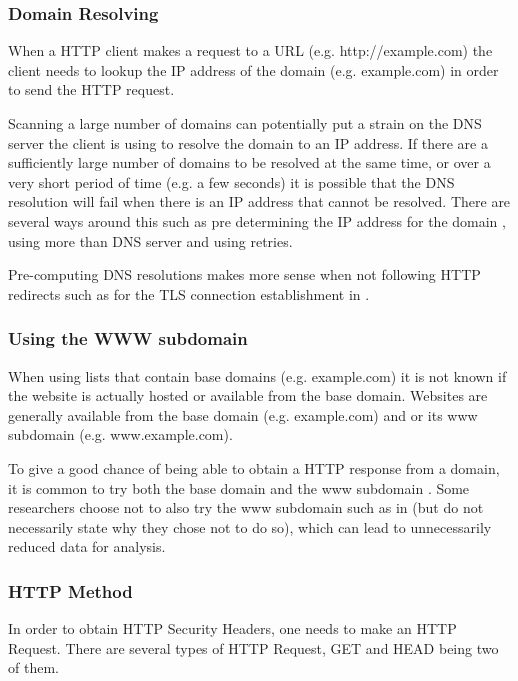 \documentclass{mscreport}
\begin{document}
\subsubsection{Domain Resolving}

When a HTTP client makes a request to a URL (e.g. http://example.com) the client needs to lookup the IP address of the domain (e.g. example.com) in order to send the HTTP request.

\vspace{0.3cm} \noindent
Scanning a large number of domains can potentially put a strain on the DNS server the client is using to resolve the domain to an IP address. If there are a sufficiently large number of domains to be resolved at the same time, or over a very short period of time (e.g. a few seconds) it is possible that the DNS resolution will fail when there is an IP address that cannot be resolved. There are several ways around this such as pre determining the IP address for the domain \cite{Amann2017-co}, using more than DNS server and using retries.

\vspace{0.3cm} \noindent
Pre-computing DNS resolutions makes more sense when not following HTTP redirects such as for the TLS connection establishment in \cite{Amann2017-co,Holz2020-ha}.

\subsubsection{Using the WWW subdomain}

When using lists that contain base domains (e.g. example.com) it is not known if the website is actually hosted or available from the base domain. Websites are generally available from the base domain (e.g. example.com) and or its www subdomain (e.g. www.example.com).

\vspace{0.3cm} \noindent
To give a good chance of being able to obtain a HTTP response from a domain, it is common to try both the base domain and the www subdomain \cite{Chen2016-dl,Kumar2017-qw,Ying2016-ag,Michael2015-hn}. Some researchers choose not to also try the www subdomain such as in \cite{Buchanan2018-xz,Amann2017-co} (but do not necessarily state why they chose not to do so), which can lead to unnecessarily reduced data for analysis.

\subsubsection{HTTP Method}
In order to obtain HTTP Security Headers, one needs to make an HTTP Request. There are several types of HTTP Request, GET and HEAD being two of them.
\end{document}
